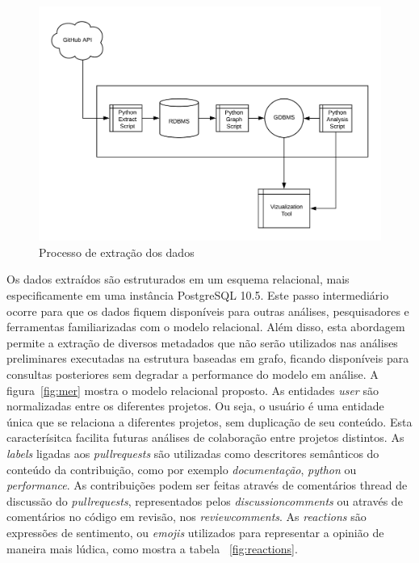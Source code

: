 \documentclass[a4paper,12pt]{monografia}
\theoremstyle{plain}
\theoremstyle{definition}
\theoremstyle{remark}
\begin{document}
\begin{figure}[!htbp]
 \includegraphics[width=\textwidth]{processo_extracao}
 \caption{Processo de extração dos dados}\label{fig:processo_extracao}
\end{figure}


Os dados extraídos são estruturados em um esquema relacional, mais especificamente em uma instância PostgreSQL 10.5. Este passo intermediário ocorre para que os dados fiquem disponíveis para outras análises, pesquisadores e ferramentas familiarizadas com o modelo relacional. Além disso, esta abordagem permite a extração de diversos metadados que não serão utilizados nas análises preliminares executadas na estrutura baseadas em grafo, ficando disponíveis para consultas posteriores sem degradar a performance do modelo em análise. A figura~\ref{fig:mer} mostra o modelo relacional proposto. As entidades \textit{user} são normalizadas entre os diferentes projetos. Ou seja, o usuário é uma entidade única que se relaciona a diferentes projetos, sem duplicação de seu conteúdo. Esta caracterísitca facilita futuras análises de colaboração entre projetos distintos. As \textit{labels} ligadas aos \textit{pullrequests} são utilizadas como descritores semânticos do conteúdo da contribuição, como por exemplo \textit{documentação}, \textit{python} ou \textit{performance}. As contribuições podem ser feitas através de comentários thread de discussão do \textit{pullrequests}, representados pelos \textit{discussioncomments} ou através de comentários no código em revisão, nos \textit{reviewcomments}. As \textit{reactions} são expressões de sentimento, ou \textit{emojis} utilizados para representar a opinião de maneira mais lúdica, como mostra a tabela ~\ref{fig:reactions}.
\end{document}
